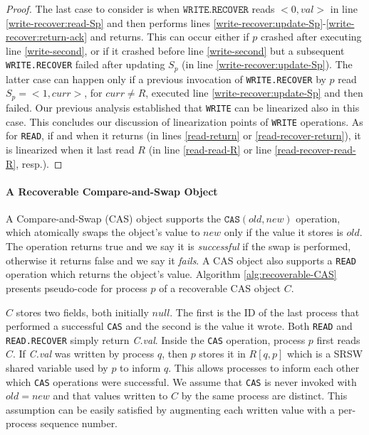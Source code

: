 \begin{proof}
The last case to consider is when $\texttt{WRITE.RECOVER}$ reads ${<}0,val{>}$ in line \ref{write-recover:read-Sp} and then performs lines \ref{write-recover:update-Sp}-\ref{write-recover:return-ack} and returns. This can occur either if $p$ crashed after executing line \ref{write-second}, or if it crashed before line \ref{write-second} but a subsequent  \texttt{WRITE.RECOVER} failed after updating $S_p$ (in line \ref{write-recover:update-Sp}). The latter case can happen only if a previous invocation of \texttt{WRITE.RECOVER} by $p$ read $S_p={<}1,curr{>}$, for $curr \neq R$, executed line \ref{write-recover:update-Sp} and then failed. Our previous analysis established that \texttt{WRITE} can be linearized also in this case. This concludes our discussion of linearization points of \texttt{WRITE} operations. As for \texttt{READ}, if and when it returns (in lines \ref{read-return} or \ref{read-recover-return}), it is linearized when it last read $R$ (in line \ref{read-read-R} or line \ref{read-recover-read-R}, resp.).
\end{proof}


\paragraph*{A Recoverable Compare-and-Swap Object}

A Compare-and-Swap (CAS) object supports the $\texttt{CAS}(old,new)$ operation, which atomically swaps the object's value to $new$ only if the value it stores is $old$. The operation returns true and we say it is \emph{successful} if the swap is performed, otherwise it returns false and we say it \emph{fails}. A CAS object also supports a \texttt{READ} operation which returns the object's value. Algorithm \ref{alg:recoverable-CAS} presents  pseudo-code for process $p$ of a recoverable CAS object $C$. %


$C$ stores two fields, both initially $null$. The first is the ID of the last process that performed a successful \texttt{CAS} and the second is the value it wrote. Both \texttt{READ} and \texttt{READ.RECOVER} simply return \emph{C.val}. Inside the \texttt{CAS} operation, process $p$ first reads $C$. If \emph{C.val} was written by process $q$, then $p$ stores it in $R[q,p]$ which is a SRSW shared variable used by $p$ to inform $q$. This allows processes to inform each other which \texttt{CAS} operations were successful. We assume that \texttt{CAS} is never invoked with $old=new$ and that values written to $C$ by the same process are distinct. This assumption can be easily satisfied by augmenting each written value with a per-process sequence number.

